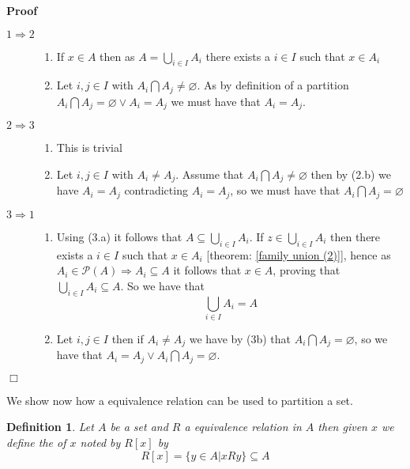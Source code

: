 \documentclass{book}
\newcommand{\tmtextbf}[1]{\text{{\bfseries{#1}}}}
\newenvironment{enumeratealpha}{\begin{enumerate}[a{\textup{)}}] }{\end{enumerate}}
\newenvironment{proof}{\noindent\textbf{Proof\ }}{\hspace*{\fill}$\Box$\medskip}
\newtheorem{definition}{Definition}
{\theorembodyfont{\rmfamily}\newtheorem{example}{Example}}
\begin{document}
\begin{proof}
  
  \begin{description}
    \item[$1 \Rightarrow 2$] 
    \begin{enumeratealpha}
      \item If $x \in A$ then as $A = \bigcup_{i \in I} A_i$ there exists a $i
      \in I$ such that $x \in A_i$
      
      \item Let $i, j \in I$ with $A_i \bigcap A_j \neq \varnothing$. As by
      definition of a partition $A_i \bigcap A_j = \varnothing \vee A_i = A_j$
      we must have that $A_i = A_j$.
    \end{enumeratealpha}
    \item[$2 \Rightarrow 3$] 
    \begin{enumeratealpha}
      \item This is trivial
      
      \item Let $i, j \in I$ with $A_i \neq A_j$. Assume that $A_i \bigcap A_j
      \neq \varnothing$ then by (2.b) we have $A_i = A_j$ contradicting $A_i =
      A_j$, so we must have that $A_i \bigcap A_j = \varnothing$
    \end{enumeratealpha}
    \item[$3 \Rightarrow 1$] 
    \begin{enumeratealpha}
      \item Using (3.a) it follows that $A \subseteq \bigcup_{i \in I} A_i$.
      If $z \in \bigcup_{i \in I} A_i$ then there exists a $i \in I$ such that
      $x \in A_i$ [theorem: \ref{family union (2)}], hence as $A_i \in
      \mathcal{P} (A) \Rightarrow A_i \subseteq A$ it follows that $x \in A$,
      proving that $\bigcup_{i \in I} A_i \subseteq A$. So we have that
      \[ \bigcup_{i \in I} A_i = A \]
      \item Let $i, j \in I$ then if $A_i \neq A_j$ we have by (3b) that $A_i
      \bigcap A_j = \varnothing$, so we have that $A_i = A_j \vee A_i \bigcap
      A_j = \varnothing$.
    \end{enumeratealpha}
  \end{description}
\end{proof}

We show now how a equivalence relation can be used to partition a set.

\begin{definition}
  \label{equivalence relation class}{}Let $A$ be a set and $R$
  a equivalence relation in $A$ then given $x$ we define the
  \tmtextbf{equivalence} \tmtextbf{class} of $x$ noted by $R [x]$ by
  \[ R [x] = \{ y \in A|x R y \} \subseteq A \]
\end{definition}
\end{document}

